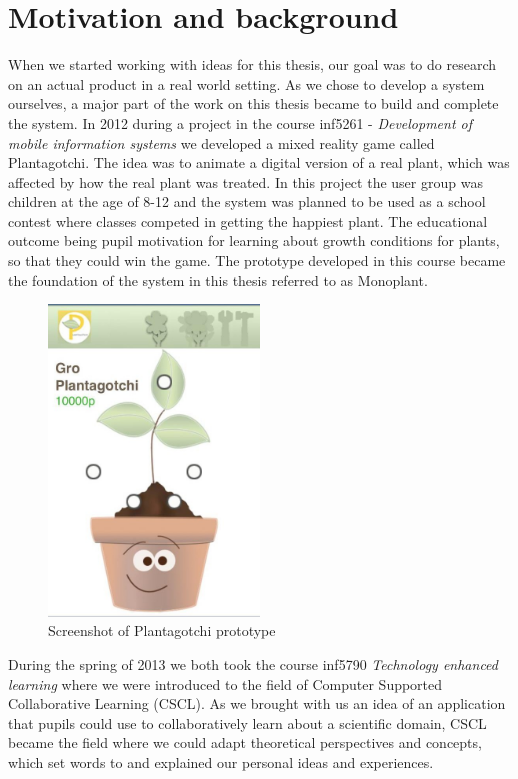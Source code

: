   


\section{Motivation and background}
When we started working with ideas for this thesis, our goal was to do research on an actual product in a real world setting. As we chose to develop a system ourselves, a major part of the work on this thesis became to build and complete the system. In 2012 during a project in the course inf5261 - \emph{Development of mobile information systems} we developed a mixed reality game called Plantagotchi. The idea was to animate a digital version of a real plant, which was affected by how the real plant was treated. In this project the user group was children at the age of 8-12 and the system was planned to be used as a school contest where classes competed in getting the happiest plant. The educational outcome being pupil motivation for learning about growth conditions for plants, so that they could win the game. The prototype developed in this course became the foundation of the system in this thesis referred to as Monoplant.

\begin{figure}
\centering
\includegraphics[width=0.5\textwidth]{img/introduction/plantagotchi.jpg}
\caption{Screenshot of Plantagotchi prototype}
\label{fig:scrshotplantagotchi}
\end{figure}

During the spring of 2013 we both took the course inf5790 \emph{Technology enhanced learning} where we were introduced to the field of Computer Supported Collaborative Learning (CSCL). As we brought with us an idea of an application that pupils could use to collaboratively learn about a scientific domain, CSCL became the field where we could adapt theoretical perspectives and concepts, which set words to and explained our personal ideas and experiences. 

